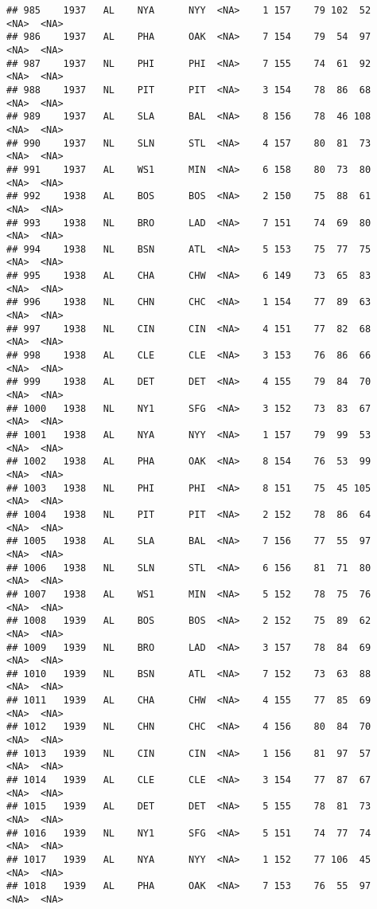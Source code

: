 \documentclass[]{article}
\begin{document}
\begin{verbatim}
## 985    1937   AL    NYA      NYY  <NA>    1 157    79 102  52   <NA>  <NA>
## 986    1937   AL    PHA      OAK  <NA>    7 154    79  54  97   <NA>  <NA>
## 987    1937   NL    PHI      PHI  <NA>    7 155    74  61  92   <NA>  <NA>
## 988    1937   NL    PIT      PIT  <NA>    3 154    78  86  68   <NA>  <NA>
## 989    1937   AL    SLA      BAL  <NA>    8 156    78  46 108   <NA>  <NA>
## 990    1937   NL    SLN      STL  <NA>    4 157    80  81  73   <NA>  <NA>
## 991    1937   AL    WS1      MIN  <NA>    6 158    80  73  80   <NA>  <NA>
## 992    1938   AL    BOS      BOS  <NA>    2 150    75  88  61   <NA>  <NA>
## 993    1938   NL    BRO      LAD  <NA>    7 151    74  69  80   <NA>  <NA>
## 994    1938   NL    BSN      ATL  <NA>    5 153    75  77  75   <NA>  <NA>
## 995    1938   AL    CHA      CHW  <NA>    6 149    73  65  83   <NA>  <NA>
## 996    1938   NL    CHN      CHC  <NA>    1 154    77  89  63   <NA>  <NA>
## 997    1938   NL    CIN      CIN  <NA>    4 151    77  82  68   <NA>  <NA>
## 998    1938   AL    CLE      CLE  <NA>    3 153    76  86  66   <NA>  <NA>
## 999    1938   AL    DET      DET  <NA>    4 155    79  84  70   <NA>  <NA>
## 1000   1938   NL    NY1      SFG  <NA>    3 152    73  83  67   <NA>  <NA>
## 1001   1938   AL    NYA      NYY  <NA>    1 157    79  99  53   <NA>  <NA>
## 1002   1938   AL    PHA      OAK  <NA>    8 154    76  53  99   <NA>  <NA>
## 1003   1938   NL    PHI      PHI  <NA>    8 151    75  45 105   <NA>  <NA>
## 1004   1938   NL    PIT      PIT  <NA>    2 152    78  86  64   <NA>  <NA>
## 1005   1938   AL    SLA      BAL  <NA>    7 156    77  55  97   <NA>  <NA>
## 1006   1938   NL    SLN      STL  <NA>    6 156    81  71  80   <NA>  <NA>
## 1007   1938   AL    WS1      MIN  <NA>    5 152    78  75  76   <NA>  <NA>
## 1008   1939   AL    BOS      BOS  <NA>    2 152    75  89  62   <NA>  <NA>
## 1009   1939   NL    BRO      LAD  <NA>    3 157    78  84  69   <NA>  <NA>
## 1010   1939   NL    BSN      ATL  <NA>    7 152    73  63  88   <NA>  <NA>
## 1011   1939   AL    CHA      CHW  <NA>    4 155    77  85  69   <NA>  <NA>
## 1012   1939   NL    CHN      CHC  <NA>    4 156    80  84  70   <NA>  <NA>
## 1013   1939   NL    CIN      CIN  <NA>    1 156    81  97  57   <NA>  <NA>
## 1014   1939   AL    CLE      CLE  <NA>    3 154    77  87  67   <NA>  <NA>
## 1015   1939   AL    DET      DET  <NA>    5 155    78  81  73   <NA>  <NA>
## 1016   1939   NL    NY1      SFG  <NA>    5 151    74  77  74   <NA>  <NA>
## 1017   1939   AL    NYA      NYY  <NA>    1 152    77 106  45   <NA>  <NA>
## 1018   1939   AL    PHA      OAK  <NA>    7 153    76  55  97   <NA>  <NA>

\end{verbatim}
\end{document}
